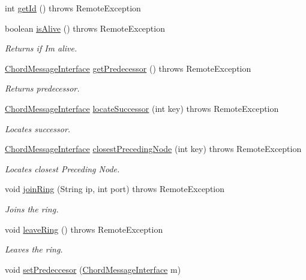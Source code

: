 \begin{DoxyCompactItemize}
int \hyperlink{class_chord_a7c6a50aff653bafc040f923c93061bdb}{get\+Id} ()  throws Remote\+Exception 
\item 
boolean \hyperlink{class_chord_a0a677ced19cc0cb5afd2a695977aeb95}{is\+Alive} ()  throws Remote\+Exception 
\begin{DoxyCompactList}\small\item\em Returns if I\textquotesingle{}m alive. \end{DoxyCompactList}\item 
\hyperlink{interface_chord_message_interface}{Chord\+Message\+Interface} \hyperlink{class_chord_a3f1aadce3820e808c80662bb61a58e34}{get\+Predecessor} ()  throws Remote\+Exception 
\begin{DoxyCompactList}\small\item\em Returns predecessor. \end{DoxyCompactList}\item 
\hyperlink{interface_chord_message_interface}{Chord\+Message\+Interface} \hyperlink{class_chord_aa53f4f7c97122395a33d064460538db0}{locate\+Successor} (int key)  throws Remote\+Exception 
\begin{DoxyCompactList}\small\item\em Locates successor. \end{DoxyCompactList}\item 
\hyperlink{interface_chord_message_interface}{Chord\+Message\+Interface} \hyperlink{class_chord_a77a9443c945cf5482f59edf685c1dc70}{closest\+Preceding\+Node} (int key)  throws Remote\+Exception 
\begin{DoxyCompactList}\small\item\em Locates closest Preceding Node. \end{DoxyCompactList}\item 
void \hyperlink{class_chord_ace0b8d2768590d7527af155c6573cae7}{join\+Ring} (String ip, int port)  throws Remote\+Exception 
\begin{DoxyCompactList}\small\item\em Joins the ring. \end{DoxyCompactList}\item 
void \hyperlink{class_chord_aa1906d1d721280b3a10a7754f604990a}{leave\+Ring} ()  throws Remote\+Exception     
\begin{DoxyCompactList}\small\item\em Leaves the ring. \end{DoxyCompactList}\item 
void \hyperlink{class_chord_a03cd68070e7cf5a96e015773df7ab034}{set\+Predeccesor} (\hyperlink{interface_chord_message_interface}{Chord\+Message\+Interface} m)

\end{DoxyCompactItemize}
